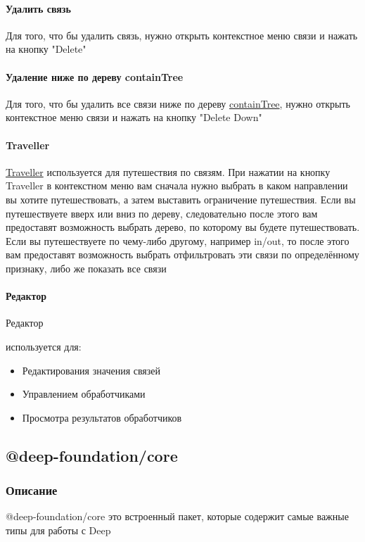 \documentclass{article}
\begin{document}
\paragraph{Удалить связь}
Для того, что бы удалить связь, нужно открыть контекстное меню связи и нажать
на кнопку "Delete"
\paragraph{Удаление ниже по дереву
  containTree}\hypertarget{containTree.Deletion.Example}{}
Для того, что бы удалить все связи ниже по дереву
\hyperlink{containTree.Description}{containTree}, нужно открыть контекстное
меню связи
и нажать на кнопку "Delete Down"
\paragraph*{Traveller}
\hyperlink{Traveller.Description}{Traveller} используется для путешествия по
связям.
При нажатии на кнопку Traveller в контекстном меню вам сначала нужно выбрать в
каком направлении вы хотите путешествовать, а затем выставить ограничение
путешествия.
Если вы путешествуете вверх или вниз по дереву, следовательно после этого вам
предоставят возможность выбрать дерево, по которому вы будете путешествовать.
Если вы путешествуете по чему-либо другому, например in/out, то после этого вам
предоставят возможность выбрать отфильтровать эти связи по определённому
признаку, либо же показать все связи
\paragraph*{Редактор}
\hypertarget{Editor.Description}{Редактор} используется для:
\begin{itemize}
  \item Редактирования значения связей
  \item Управлением обработчиками
  \item Просмотра результатов обработчиков
\end{itemize}


\subsection{@deep-foundation/core}
\subsubsection{Описание}\hypertarget{Core.Description}{}
@deep-foundation/core это встроенный пакет, которые
содержит самые важные типы для работы с Deep
\end{document}
